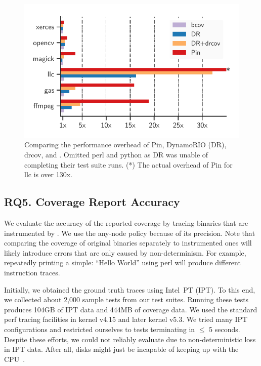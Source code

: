 \begin{figure}[t!]
    \centering
    \includegraphics[clip, trim=0.48cm 0.4cm 0.49cm 0.73cm, width=0.9\columnwidth]{fig/dbi-overhead.pdf}
    \caption{Comparing the performance overhead of Pin, DynamoRIO (DR), \textsf{drcov}, and {\bcov}. Omitted \textsf{perl} and \textsf{python} as DR was  unable of completing their test suite runs. 
        (*) The actual overhead of Pin for \textsf{llc} is over 130x.}
    \label{fig:dbi-tools-comparison}
\end{figure}


\subsection*{RQ5. Coverage Report Accuracy}
We evaluate the accuracy of the reported coverage by tracing binaries that are instrumented by {\bcov}. 
We use the any-node policy because of its precision.
Note that comparing the coverage of original binaries separately to instrumented ones will likely introduce errors that are only caused by non-determinism.
For example, repeatedly printing a simple: ``Hello World'' using \textsf{perl} will produce different instruction traces.



Initially, we obtained the ground truth traces using Intel~PT (IPT).
To this end, we collected about 2,000 sample tests from our test suites.
Running these tests produces 104GB of IPT data and 444MB of {\bcov} coverage data.
We used the standard \textsf{perf} tracing facilities in kernel v4.15 and later kernel v5.3.
We tried many IPT configurations and restricted ourselves to tests terminating in $ \le $ 5 seconds.
Despite these efforts, we could not reliably evaluate {\bcov} due to non-deterministic loss in IPT data. 
After all, disks might just be incapable of keeping up with the CPU~\cite{IntelPTLinuxDocs}.

